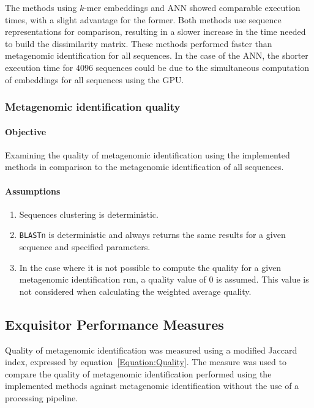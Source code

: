 \documentclass[pdflatex,sn-vancouver-num]{sn-jnl}%
\begin{document}
                The methods using $k$-mer embeddings and ANN showed comparable execution times, with a slight advantage for the former. Both methods use sequence representations for comparison, resulting in a slower increase in the time needed to build the dissimilarity matrix. These methods performed faster than metagenomic identification for all sequences. In the case of the ANN, the shorter execution time for $4096$ sequences could be due to the simultaneous computation of embeddings for all sequences using the GPU.

            \subsubsection{Metagenomic identification quality}
                \paragraph{Objective}
                Examining the quality of metagenomic identification using the implemented methods in comparison to the metagenomic identification of all sequences.

                \paragraph{Assumptions}
                \begin{enumerate}
                    \item {
                        Sequences clustering is deterministic.
                    }
                    \item {
                        \texttt{BLASTn} is deterministic and always returns the same results for a given sequence and specified parameters.
                    }
                    \item {
                        In the case where it is not possible to compute the quality for a given metagenomic identification run, a quality value of $0$ is assumed. This value is not considered when calculating the weighted average quality.
                    }
                  \end{enumerate}


        \subsection{Exquisitor Performance Measures}
            Quality of metagenomic identification was measured using a modified Jaccard index, expressed by equation~\ref{Equation:Quality}. The measure was used to compare the quality of metagenomic identification performed using the implemented methods against metagenomic identification without the use of a processing pipeline.
\end{document}
